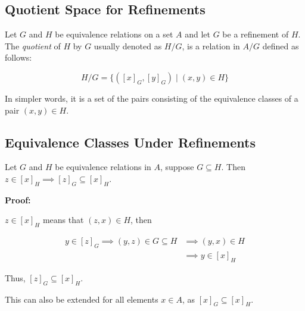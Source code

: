 \subsection{Quotient Space for Refinements}

Let \(G\) and \(H\) be equivalence relations on a set \(A\) and let \(G\) be a refinement of \(H\).
The \emph{quotient} of \(H\) by \(G\) usually denoted as \(H/G\), is a relation in \(A/G\) defined as follows:

\[
	H/G = \{([x]_{G}, [y]_{G}) \mid (x, y) \in H\}
\]

In simpler words, it is a set of the pairs consisting of the equivalence classes of a pair \((x, y) \in H\).

\subsection{Equivalence Classes Under Refinements}

Let \(G\) and \(H\) be equivalence relations in \(A\), suppose \(G \subseteq H\). Then
\(z \in [x]_{H} \implies [z]_G \subseteq [x]_H\).

\textbf{Proof:}

\(z \in [x]_{H}\) means that \((z, x) \in H\), then

\begin{align*}
	y \in [z]_G	\implies (y, z) \in G \subseteq H & \implies (y, x) \in H \\
	                                              & \implies y \in [x]_H
\end{align*}

Thus, \([z]_G \subseteq [x]_H\).

\QED

This can also be extended for all elements \(x \in A\), as \([x]_G \subseteq [x]_H\).

